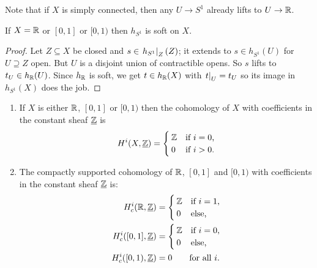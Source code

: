 \documentclass[../main.tex]{subfiles}
\begin{document}
\begin{rmk}
    Note that if $X$ is simply connected, then any $U\to S^1$ already lifts to $U\to \mathbb{R}$.
\end{rmk}


\begin{lem}
    If $X = \mathbb{R}$ or $[0,1]$ or $[0,1)$ then $h_{S^1}$ is soft on $X$.
\end{lem}

\begin{proof}
    Let $Z\subseteq X$ be closed and $s\in \left.h_{S^1}\right|_{Z}(Z)$; it extends to $s\in h_{S^1}(U)$ for $U\supseteq Z$ open. But $U$ is a disjoint union of contractible opens. So $s$ lifts to $t_U \in h_{\mathbb{R}}(U)$. Since $h_{\mathbb{R}}$ is soft, we get $t\in h_{\mathbb{R}}(X)$ with $\left.t\right|_{U} = t_U$ so its image in $h_{S^1}(X)$ does the job.
\end{proof}

\begin{cor}\label{cor:computation-cohomology-interval-real-line}
    \begin{enumerate}
        \item If $X$ is either $\mathbb{R}$, $[0,1]$ or $[0,1)$ then the cohomology of \(X\) with coefficients in the constant sheaf \(\underline{\mathbb{Z}}\) is $$H^i(X, \underline{\mathbb{Z}}) = \begin{cases}
            \mathbb{Z} & \text{if } i = 0\text{,} \\ 
            0 & \text{if } i>0\text{.}
        \end{cases}$$
        \item The compactly supported cohomology of \(\mathbb{R}\), \([0,1]\) and \([0,1)\) with coefficients in the constant sheaf \(\underline{\mathbb{Z}}\) is:
        \begin{align*}
            H^i_c(\mathbb{R}, \underline{\mathbb{Z}}) &= \begin{cases}
                \mathbb{Z} & \text{if } i = 1\text{,} \\
                0 & \text{else,}
            \end{cases} \\
            H^i_c([0,1], \underline{\mathbb{Z}}) &= \begin{cases}
                \mathbb{Z} & \text{if } i = 0\text{,} \\
                0 & \text{else,}
            \end{cases} \\
            H^i_c([0,1), \underline{\mathbb{Z}}) &= 0 \qquad \text{for all } i\text{.}
        \end{align*}
    \end{enumerate}
\end{cor}
\end{document}
